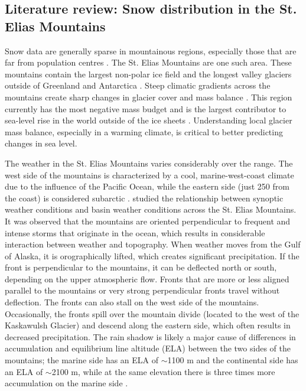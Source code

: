 \documentclass{sfuthesis}
\begin{document}
\begin{appendices}
\chapter{Literature review: Snow distribution in the St. Elias Mountains}

Snow data are generally sparse in mountainous regions, especially those that are far from population centres \citep{Marcus1970}. The St. Elias Mountains are one such area. These mountains contain the largest non-polar ice field and the longest valley glaciers outside of Greenland and Antarctica \citep{Marcus1970, Danby2003}. Steep climatic gradients across the mountains create sharp changes in glacier cover and mass balance \citep{Clarke2002}. This region currently has the most negative mass budget and is the largest contributor to sea-level rise in the world outside of the ice sheets \citep{Kaser2006, Gardner2013}. Understanding local glacier mass balance, especially in a warming climate, is critical to better predicting changes in sea level. 

The weather in the St. Elias Mountains varies considerably over the range. The west side of the mountains is characterized by a cool, marine-west-coast climate due to the influence of the Pacific Ocean, while the eastern side (just 250 from the coast) is considered subarctic \citep{Marcus1970}. \cite{Taylor1969} studied the relationship between synoptic weather conditions and basin weather conditions across the St. Elias Mountains. It was observed that the mountains are oriented perpendicular to frequent and intense storms that originate in the ocean, which results in considerable interaction between weather and topography. When weather moves from the Gulf of Alaska, it is orographically lifted, which creates significant precipitation. If the front is perpendicular to the mountains, it can be deflected north or south, depending on the upper atmospheric flow. Fronts that are more or less aligned parallel to the mountains or very strong perpendicular fronts travel without deflection. The fronts can also stall on the west side of the mountains. Occasionally, the fronts spill over the mountain divide (located to the west of the Kaskawulsh Glacier) and descend along the eastern side, which often results in decreased precipitation. The rain shadow is likely a major cause of differences in accumulation and equilibrium line altitude (ELA) between the two sides of the mountains; the marine side has an ELA of $\sim$1100 m and the continental side has an ELA of $\sim$2100 m, while at the same elevation there is three times more accumulation on the marine side \citep{Marcus1970}.


\end{appendices}
\end{document}
